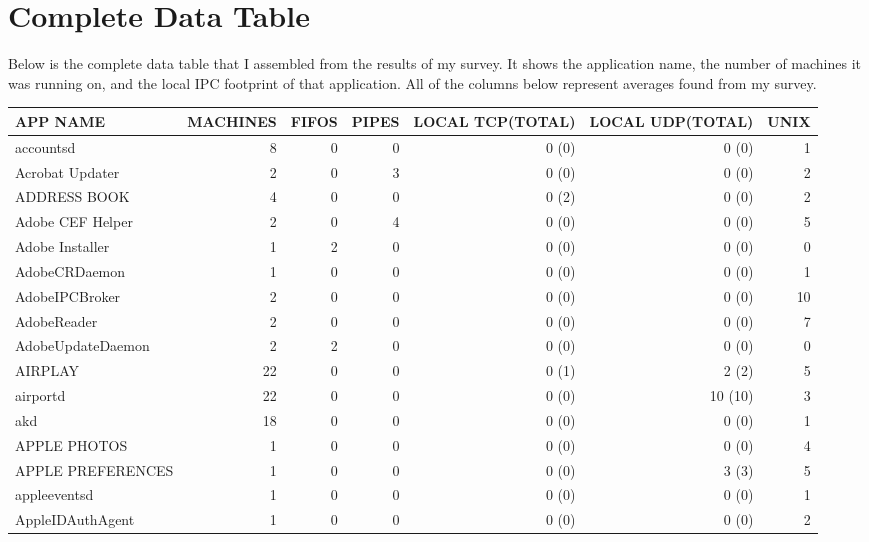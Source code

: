\chapter{Complete Data Table}
\label{appendix:allData}
Below is the complete data table that I assembled from the results of my survey.  It shows the application name, the number of machines it was running on, and the local IPC footprint of that application.  All of the columns below represent averages found from my survey.


\setlength\LTleft{-1in}
\begin{adjustwidth}{-2in}{}
\begin{scriptsize}
\begin{longtable}[l]{ l | r | r | r | r | r | r }
    \hline
    APP NAME &  MACHINES &  FIFOS &  PIPES & LOCAL TCP(TOTAL) & LOCAL UDP(TOTAL) & UNIX \\ \hline
    \endhead
    accountsd &  8 &  0 &  0 &  0 (0) &  0 (0) &  1 \\ \hline
    Acrobat Updater & 2 &  0 &  3 &  0 (0) &  0 (0) &  2 \\ \hline
    ADDRESS BOOK & 4 &  0 &  0 &  0 (2) &  0 (0) &  2 \\ \hline
    Adobe CEF Helper & 2 &  0 &  4 &  0 (0) &  0 (0) &  5 \\ \hline
    Adobe Installer & 1 &  2 &  0 &  0 (0) &  0 (0) &  0 \\ \hline
    AdobeCRDaemon &  1 &  0 &  0 &  0 (0) &  0 (0) &  1 \\ \hline
    AdobeIPCBroker & 2 &  0 &  0 &  0 (0) &  0 (0) & 10 \\ \hline
    AdobeReader &  2 &  0 &  0 &  0 (0) &  0 (0) &  7 \\ \hline
    AdobeUpdateDaemon &  2 &  2 &  0 &  0 (0) &  0 (0) &  0 \\ \hline
    AIRPLAY & 22 &  0 &  0 &  0 (1) &  2 (2) &  5 \\ \hline
    airportd &  22 &  0 &  0 &  0 (0) &  10 (10) &  3 \\ \hline
    akd & 18 &  0 &  0 &  0 (0) &  0 (0) &  1 \\ \hline
    APPLE PHOTOS & 1 &  0 &  0 &  0 (0) &  0 (0) &  4 \\ \hline
    APPLE PREFERENCES &  1 &  0 &  0 &  0 (0) &  3 (3) &  5 \\ \hline
    appleeventsd & 1 &  0 &  0 &  0 (0) &  0 (0) &  1 \\ \hline
    AppleIDAuthAgent & 1 &  0 &  0 &  0 (0) &  0 (0) &  2 \\ \hline

\end{longtable}
\end{scriptsize}
\end{adjustwidth}
